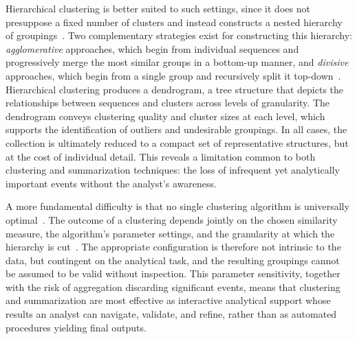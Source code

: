Hierarchical clustering is better suited to such settings, since it does not presuppose a fixed number of clusters and instead constructs a nested hierarchy of groupings~\cite{ran2023comprehensive}.
Two complementary strategies exist for constructing this hierarchy: \textit{agglomerative} approaches, which begin from individual sequences and progressively merge the most similar groups in a bottom-up manner, and \textit{divisive} approaches, which begin from a single group and recursively split it top-down~\cite{ran2023comprehensive}.
Hierarchical clustering produces a dendrogram, a tree structure that depicts the relationships between sequences and clusters across levels of granularity.
The dendrogram conveys clustering quality and cluster sizes at each level, which supports the identification of outliers and undesirable groupings.
In all cases, the collection is ultimately reduced to a compact set of representative structures, but at the cost of individual detail.
This reveals a limitation common to both clustering and summarization techniques: the loss of infrequent yet analytically important events without the analyst's awareness.

A more fundamental difficulty is that no single clustering algorithm is universally optimal~\cite{estivillcastro2002why}.
The outcome of a clustering depends jointly on the chosen similarity measure, the algorithm's parameter settings, and the granularity at which the hierarchy is cut~\cite{keogh2005clustering}.
The appropriate configuration is therefore not intrinsic to the data, but contingent on the analytical task, and the resulting groupings cannot be assumed to be valid without inspection.
This parameter sensitivity, together with the risk of aggregation discarding significant events, means that clustering and summarization are most effective as interactive analytical support whose results an analyst can navigate, validate, and refine, rather than as automated procedures yielding final outputs.



